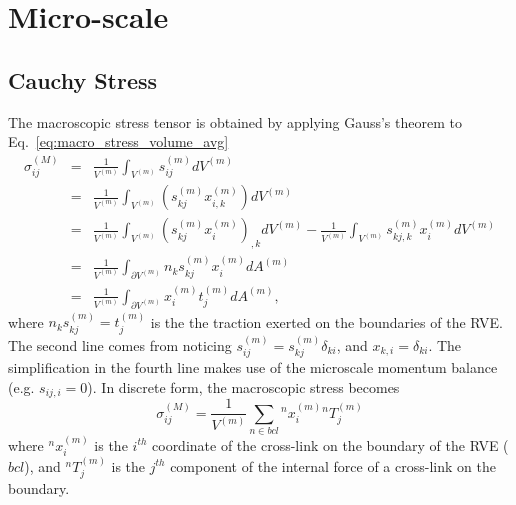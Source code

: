 \section{Micro-scale}
%
\subsection{Cauchy Stress}
%
The macroscopic stress tensor is obtained by applying Gauss's theorem to Eq.\ \eqref{eq:macro_stress_volume_avg}
%
\begin{eqnarray}
\sigma_{ij}^{(M)} &=& \frac{1}{V^{(m)}} \int_{V^{(m)}} s_{ij}^{(m)} dV^{(m)} \nonumber\\
%
&=& \frac{1}{V^{(m)}} \int_{V^{(m)}} (s_{kj}^{(m)} x_{i,k}^{(m)}) dV^{(m)} \nonumber\\
%
&=& \frac{1}{V^{(m)}} \int_{V^{(m)}} (s_{kj}^{(m)} x_i^{(m)})_{,k}dV^{(m)} - \frac{1}{V^{(m)}}\int_{V^{(m)}} s_{kj,k}^{(m)} x_i^{(m)} dV^{(m)} \nonumber\\
%
&=& \frac{1}{V^{(m)}} \int_{\partial V^{(m)}} n_k s_{kj}^{(m)} x_i^{(m)} dA^{(m)} \nonumber\\
%
&=& \frac{1}{V^{(m)}} \int_{\partial V^{(m)}} x_i^{(m)} t_j^{(m)} dA^{(m)},
\label{eq:macro_stress_gauss_thm}
\end{eqnarray}
%
where $n_k s_{kj}^{(m)} = t_j^{(m)}$ is the the traction exerted on the boundaries of the RVE. The second line comes from noticing \(s_{ij}^{(m)}=s_{kj}^{(m)}\delta_{ki}\), and \(x_{k,i}=\delta_{ki}\). The simplification in the fourth line makes use of the microscale momentum balance (e.g. \(s_{ij,i}=0\)). In discrete form, the macroscopic stress becomes
%
\begin{equation}
\sigma_{ij}^{(M)} = \frac{1}{V^{(m)}} \sum_{n \in bcl} {}^n x_i^{(m)} {}^n T_j^{(m)} 
\label{eq:macro_stress_discrete}
\end{equation}
%
where ${}^nx_i^{(m)}$ is the $i^{th}$ coordinate of the cross-link on the boundary of the RVE ($bcl$), and ${}^nT_j^{(m)}$ is the $j^{th}$ component of the internal force of a cross-link on the boundary. 
%
